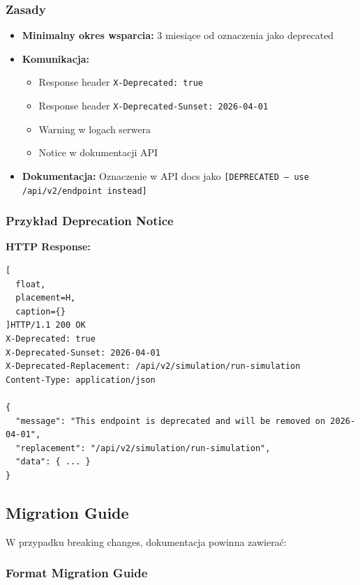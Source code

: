 \documentclass[11pt,a4paper] {article}
\begin{document}
\subsubsection{Zasady}

\begin{itemize}
    \item \textbf{Minimalny okres wsparcia:} 3 miesiące od oznaczenia jako deprecated
    \item \textbf{Komunikacja:}
    \begin{itemize}
        \item Response header \texttt{X-Deprecated: true}
        \item Response header \texttt{X-Deprecated-Sunset: 2026-04-01}
        \item Warning w logach serwera
        \item Notice w dokumentacji API
    \end{itemize}
    \item \textbf{Dokumentacja:} Oznaczenie w API docs jako \texttt{[DEPRECATED -- use /api/v2/endpoint instead]}
\end{itemize}

\subsubsection{Przykład Deprecation Notice}

\textbf{HTTP Response:}
\begin{lstlisting}[
  float,
  placement=H,
  caption={}
]HTTP/1.1 200 OK
X-Deprecated: true
X-Deprecated-Sunset: 2026-04-01
X-Deprecated-Replacement: /api/v2/simulation/run-simulation
Content-Type: application/json

{
  "message": "This endpoint is deprecated and will be removed on 2026-04-01",
  "replacement": "/api/v2/simulation/run-simulation",
  "data": { ... }
}
\end{lstlisting}

\subsection{Migration Guide}

W przypadku breaking changes, dokumentacja powinna zawierać:

\subsubsection{Format Migration Guide}
\end{document}
